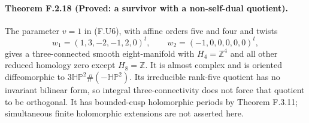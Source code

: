 \paragraph{Theorem F.2.18 (Proved: a survivor with a non-self-dual quotient).}
The parameter $v=1$ in (F.U6), with affine orders five and four
and twists
\[
 w_1=(1,3,-2,-1,2,0)^t,\qquad
 w_2=(-1,0,0,0,0,0)^t,
\]
gives a three-connected smooth eight-manifold with
$H_4=\mathbb Z^4$ and all other reduced homology zero except
$H_8=\mathbb Z$.  It is almost complex and is oriented
diffeomorphic to $3\mathbb{HP}^2\#(-\mathbb{HP}^2)$.
Its irreducible rank-five quotient has no invariant bilinear
form, so integral three-connectivity does not force that
quotient to be orthogonal.  It has bounded-cusp holomorphic
periods by Theorem F.3.11; simultaneous finite holomorphic
extensions are not asserted here.

